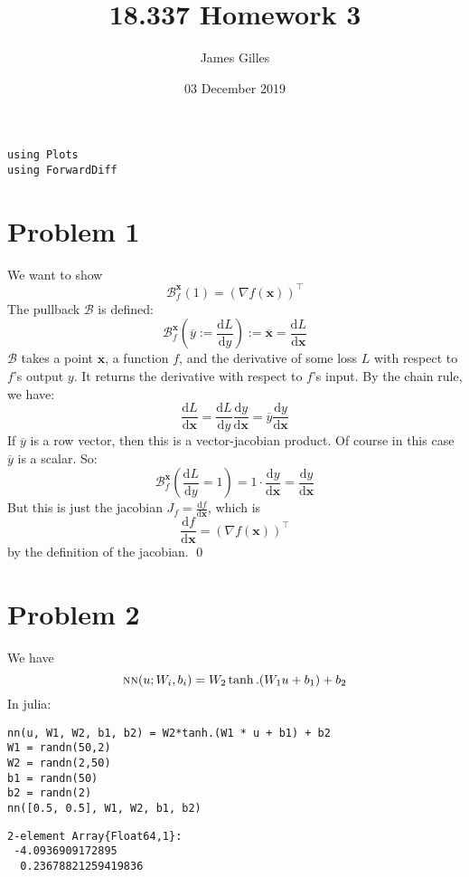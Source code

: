 \documentclass[11pt]{article}
\author{James Gilles}
\date{03 December 2019}
\title{18.337 Homework 3}
\newcommand{\B}[0]{\mathcal{B}}
\newcommand{\xv}[0]{\mathbf{x}}
\newcommand*\lgrad[1]{\overline{#1}}
\newcommand*\tderiv[2]{\frac{\mathrm{d}#1}{\mathrm{d}#2}}
\newcommand{\NN}[0]{\textsc{nn}}
\newcommand{\transpose}[1]{#1 ^\top}
\renewcommand*{\tableofcontents}[0]{}
\begin{document}
\maketitle
\tableofcontents

\begin{verbatim}
using Plots
using ForwardDiff
\end{verbatim}
\section{Problem 1}
\label{sec:orgb9e01f9}
We want to show
$$\B_f^\xv(1) = \transpose{(\nabla f(\xv))}$$
The pullback \(\B\) is defined:
$$\B^\xv_f(\lgrad{y} := \tderiv{L}{y}) := \lgrad{\xv} = \tderiv{L}{\xv}$$
\(\B\) takes a point \(\xv\), a function \(f\), and the derivative of some loss \(L\) with respect to \(f\)'s output \(y\).
It returns the derivative with respect to \(f\)'s input.
By the chain rule, we have:
$$\tderiv{L}{\xv} = \tderiv{L}{y}\tderiv{y}{\xv} = \lgrad{y} \tderiv{y}{\xv}$$
If \(\lgrad{y}\) is a row vector, then this is a vector-jacobian product. Of course in this case \(\lgrad{y}\) is a scalar.
So:
$$\B^\xv_f(\tderiv{L}{y} = 1) = 1 \cdot \tderiv{y}{\xv} = \tderiv{y}{\xv}$$
But this is just the jacobian \(J_f=\tderiv{f}{\xv}\), which is
$$\tderiv{f}{\xv}=\transpose{(\nabla f(\xv))}$$
by the definition of the jacobian. \qed
\section{Problem 2}
\label{sec:org0823f82}
We have $$\NN(u; W_i, b_i) = W_2 \tanh.(W_1 u + b_1) + b_2$$
In julia:
\begin{verbatim}
nn(u, W1, W2, b1, b2) = W2*tanh.(W1 * u + b1) + b2
W1 = randn(50,2)
W2 = randn(2,50)
b1 = randn(50)
b2 = randn(2)
nn([0.5, 0.5], W1, W2, b1, b2)
\end{verbatim}
\begin{verbatim}
2-element Array{Float64,1}:
 -4.0936909172895    
  0.23678821259419836
\end{verbatim}
\end{document}
